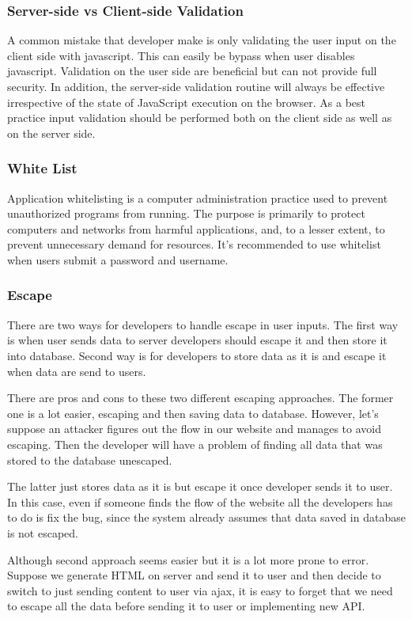 \documentclass[conference]{IEEEtran}
\begin{document}
\subsubsection{Server-side vs Client-side Validation}
A common mistake that developer make is only validating the user input on the client side with javascript. This can easily be bypass when user disables javascript. Validation on the user side are beneficial but can not provide full security. In addition, the server-side validation routine will always be effective irrespective of the state of JavaScript execution on the browser. As a best practice input validation should be performed both on the client side as well as on the server side.


\subsubsection{White List}
Application whitelisting is a computer administration practice used to prevent unauthorized programs from running. The purpose is primarily to protect computers and networks from harmful applications, and, to a lesser extent, to prevent unnecessary demand for resources\cite{whitelist}. It's recommended to use whitelist when users submit a password and username.


\subsubsection{Escape}
There are two ways for developers to handle escape in user inputs. The first way is when user sends data to server developers should escape it and then store it into database. Second way is for developers to store data as it is and escape it when data are send to users.

There are pros and cons to these two different escaping approaches. The former one is a lot easier, escaping and then saving data to database. However, let's suppose an attacker figures out the flow in our website and manages to avoid escaping. Then the developer will have a problem of finding all data that was stored to the database unescaped.

The latter just stores data as it is but escape it once developer sends it to user. In this case, even if someone finds the flow of the  website all the developers has to do is fix the bug, since the system already assumes that data saved in database is not escaped.

Although second approach seems easier but it is a lot more prone to error. Suppose we generate HTML on server and send it to user and then decide to switch to just sending content to user via ajax, it is easy to forget that we need to escape all the data before sending it to user or implementing new API.
\end{document}
